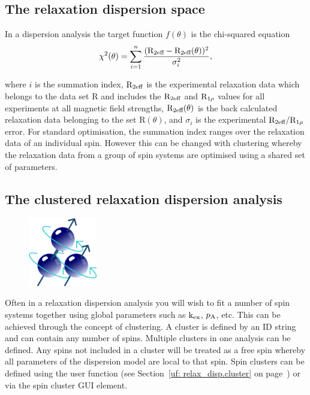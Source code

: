 
\subsection{The relaxation dispersion space}

In a dispersion analysis the target function $f(\theta)$ is the chi-squared equation
\begin{equation} \label{eq: chi2 dispersion}
 \chi^2(\theta) = \sum_{i=1}^n \frac{(\mathrm{R}_\textrm{2eff} - \mathrm{R}_\textrm{2eff}(\theta))^2}{\sigma_i^2},
\end{equation}

\noindent where $i$ is the summation index, $\mathrm{R}_\textrm{2eff}$ is the experimental relaxation data which belongs to the data set R and includes the $\mathrm{R}_\textrm{2eff}$ and $\mathrm{R}_{1\rho}$ values for all experiments at all magnetic field strengths, $\mathrm{R}_\textrm{2eff}(\theta)$ is the back calculated relaxation data belonging to the set R$(\theta)$, and $\sigma_i$ is the experimental $\mathrm{R}_\textrm{2eff}/\mathrm{R}_{1\rho}$ error.
For standard optimisation, the summation index ranges over the relaxation data of an individual spin.
However this can be changed with clustering whereby the relaxation data from a group of spin systems are optimised using a shared set of parameters.



\subsection{The clustered relaxation dispersion analysis}

\begin{figure}[h]
\includegraphics[width=3cm, bb=14 14 399 399]{graphics/misc/cluster_600x600}
\end{figure}

Often in a relaxation dispersion analysis you will wish to fit a number of spin systems together using global parameters such as $\textrm{k}_\textrm{ex}$, $p_\textrm{A}$, etc.
This can be achieved through the concept of clustering.
A cluster is defined by an ID string and can contain any number of spins.
Multiple clusters in one analysis can be defined.
Any spins not included in a cluster will be treated as a free spin whereby all parameters of the dispersion model are local to that spin.
Spin clusters can be defined using the  user function (see Section~\ref{uf: relax_disp.cluster} on page~\pageref{uf: relax_disp.cluster}) or via the spin cluster GUI element.


